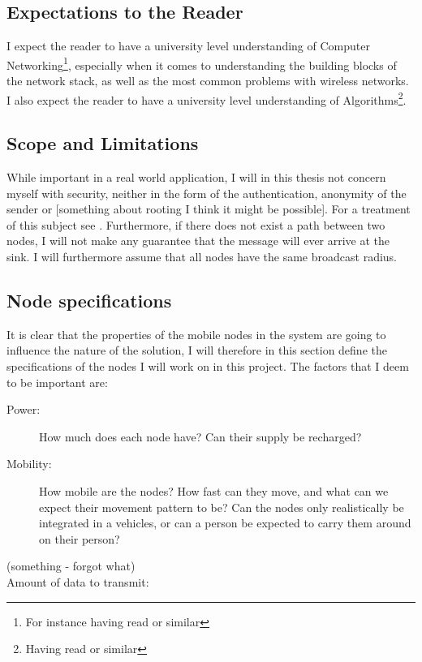 \subsection{Expectations to the Reader}
I expect the reader to have a university level understanding of Computer Networking\footnote{For instance having read \cite{ComNet} or similar}, especially when it comes to understanding the building blocks of the network stack, as well as the most common problems with wireless networks. I also expect the reader to have a university level understanding of Algorithms\footnote{Having read \cite{algo} or similar}. 

\subsection{Scope and Limitations}
While important in a real world application, I will in this thesis not concern myself with security, neither in the form of the authentication, anonymity of the sender or [something about rooting I think it might be possible]. For a treatment of this subject see \cite{trustedRouting}. Furthermore, if there does not exist a path between two nodes, I will not make any guarantee that the message will ever arrive at the sink. I will furthermore assume that all nodes have the same broadcast radius.



\subsection{Node specifications}
It is clear that the properties of the mobile nodes in the system are going to influence the nature of the solution, I will therefore in this section define the specifications of the nodes I will work on in this project. The factors that I deem to be important are: 
\begin{description}
\item[Power:] How much does each node have? Can their supply be recharged?
\item[Mobility:] How mobile are the nodes? How fast can they move, and what can we expect their movement pattern to be? Can the nodes only realistically be integrated in a vehicles, or can a person be expected to carry them around on their person?
\item[(something - forgot what)]
\item[Amount of data to transmit:] 
\end{description}

